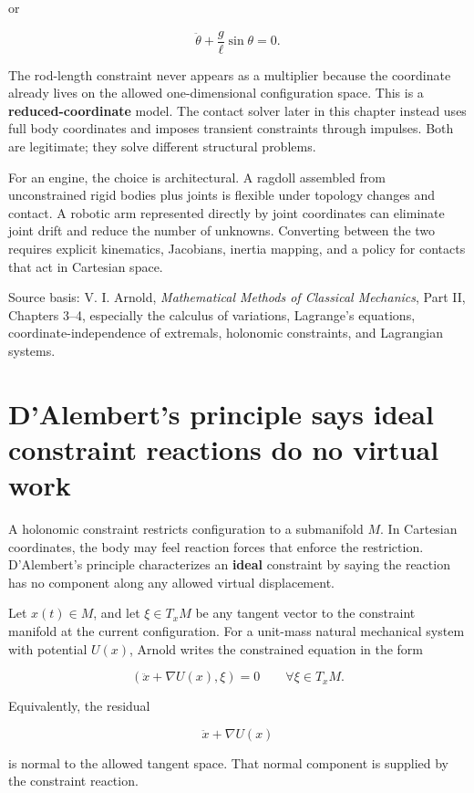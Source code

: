 or

\[
\ddot\theta+\frac{g}{\ell}\sin\theta=0.
\]

The rod-length constraint never appears as a multiplier because the coordinate already lives on the allowed one-dimensional configuration space. This is a \textbf{reduced-coordinate} model. The contact solver later in this chapter instead uses full body coordinates and imposes transient constraints through impulses. Both are legitimate; they solve different structural problems.

For an engine, the choice is architectural. A ragdoll assembled from unconstrained rigid bodies plus joints is flexible under topology changes and contact. A robotic arm represented directly by joint coordinates can eliminate joint drift and reduce the number of unknowns. Converting between the two requires explicit kinematics, Jacobians, inertia mapping, and a policy for contacts that act in Cartesian space.

Source basis: V. I. Arnold, \emph{Mathematical Methods of Classical Mechanics}, Part II, Chapters 3--4, especially the calculus of variations, Lagrange's equations, coordinate-independence of extremals, holonomic constraints, and Lagrangian systems.

\section{D'Alembert's principle says ideal constraint reactions do no virtual work}\label{06-engine-ii-ch033-dalemberts-principle-says-ideal-constraint-reactions-do-no-virtual-work}

A holonomic constraint restricts configuration to a submanifold \(M\). In Cartesian coordinates, the body may feel reaction forces that enforce the restriction. D'Alembert's principle characterizes an \textbf{ideal} constraint by saying the reaction has no component along any allowed virtual displacement.

Let \(x(t)\in M\), and let \(\xi\in T_xM\) be any tangent vector to the constraint manifold at the current configuration. For a unit-mass natural mechanical system with potential \(U(x)\), Arnold writes the constrained equation in the form

\[
\left(
\ddot x+\nabla U(x),
\xi
\right)
=
0
\qquad
\forall \xi\in T_xM.
\]

Equivalently, the residual

\[
\ddot x+\nabla U(x)
\]

is normal to the allowed tangent space. That normal component is supplied by the constraint reaction.

